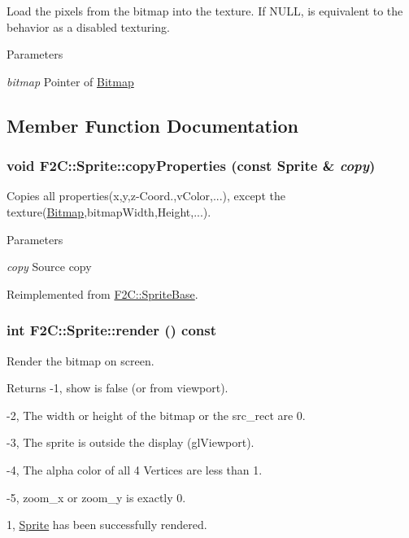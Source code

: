 Load the pixels from the bitmap into the texture. If NULL, is equivalent to the behavior as a disabled texturing. 
\begin{DoxyParams}{Parameters}
\item[{\em bitmap}]Pointer of \hyperlink{class_f2_c_1_1_bitmap}{Bitmap} \end{DoxyParams}


\subsection{Member Function Documentation}
\hypertarget{class_f2_c_1_1_sprite_a33d27869102b12705666a1712d9f645d}{
\subsubsection[{copyProperties}]{\setlength{\rightskip}{0pt plus 5cm}void F2C::Sprite::copyProperties (const {\bf Sprite} \& {\em copy})}}
\label{class_f2_c_1_1_sprite_a33d27869102b12705666a1712d9f645d}


Copies all properties(x,y,z-\/Coord.,vColor,...), except the texture(\hyperlink{class_f2_c_1_1_bitmap}{Bitmap},bitmapWidth,Height,...). 
\begin{DoxyParams}{Parameters}
\item[{\em copy}]Source copy \end{DoxyParams}


Reimplemented from \hyperlink{class_f2_c_1_1_sprite_base_a8f7ea8a95a07688bfb2e6268a52b9215}{F2C::SpriteBase}.\hypertarget{class_f2_c_1_1_sprite_a53505010baf74857c67c82150802b297}{
\subsubsection[{render}]{\setlength{\rightskip}{0pt plus 5cm}int F2C::Sprite::render () const}}
\label{class_f2_c_1_1_sprite_a53505010baf74857c67c82150802b297}


Render the bitmap on screen. \begin{DoxyReturn}{Returns}
-\/1, show is false (or from viewport). 

-\/2, The width or height of the bitmap or the src\_\-rect are 0. 

-\/3, The sprite is outside the display (glViewport). 

-\/4, The alpha color of all 4 Vertices are less than 1. 

-\/5, zoom\_\-x or zoom\_\-y is exactly 0. 

1, \hyperlink{class_f2_c_1_1_sprite}{Sprite} has been successfully rendered. 
\end{DoxyReturn}



